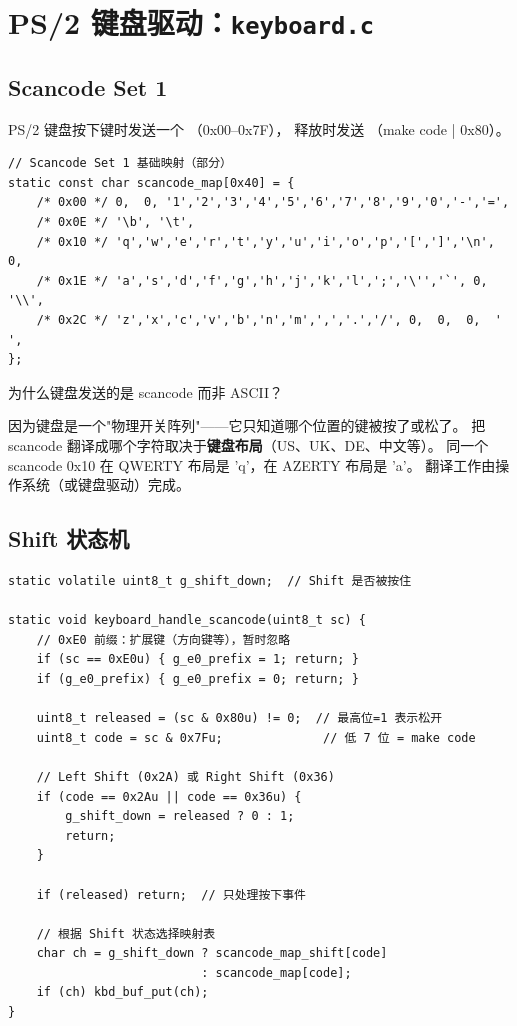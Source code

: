 \section{PS/2 键盘驱动：\texttt{keyboard.c}}

\subsection{Scancode Set 1}

PS/2 键盘按下键时发送一个 （0x00--0x7F），
释放时发送 （make code | 0x80）。

\begin{lstlisting}[style=cstyle]
// Scancode Set 1 基础映射（部分）
static const char scancode_map[0x40] = {
    /* 0x00 */ 0,  0, '1','2','3','4','5','6','7','8','9','0','-','=',
    /* 0x0E */ '\b', '\t',
    /* 0x10 */ 'q','w','e','r','t','y','u','i','o','p','[',']','\n', 0,
    /* 0x1E */ 'a','s','d','f','g','h','j','k','l',';','\'','`', 0, '\\',
    /* 0x2C */ 'z','x','c','v','b','n','m',',','.','/', 0,  0,  0,  ' ',
};
\end{lstlisting}

\begin{thinkbox}
为什么键盘发送的是 scancode 而非 ASCII？

因为键盘是一个"物理开关阵列"——它只知道哪个位置的键被按了或松了。
把 scancode 翻译成哪个字符取决于\textbf{键盘布局}（US、UK、DE、中文等）。
同一个 scancode 0x10 在 QWERTY 布局是 'q'，在 AZERTY 布局是 'a'。
翻译工作由操作系统（或键盘驱动）完成。
\end{thinkbox}

\subsection{Shift 状态机}

\begin{lstlisting}[style=cstyle]
static volatile uint8_t g_shift_down;  // Shift 是否被按住

static void keyboard_handle_scancode(uint8_t sc) {
    // 0xE0 前缀：扩展键（方向键等），暂时忽略
    if (sc == 0xE0u) { g_e0_prefix = 1; return; }
    if (g_e0_prefix) { g_e0_prefix = 0; return; }

    uint8_t released = (sc & 0x80u) != 0;  // 最高位=1 表示松开
    uint8_t code = sc & 0x7Fu;              // 低 7 位 = make code

    // Left Shift (0x2A) 或 Right Shift (0x36)
    if (code == 0x2Au || code == 0x36u) {
        g_shift_down = released ? 0 : 1;
        return;
    }

    if (released) return;  // 只处理按下事件

    // 根据 Shift 状态选择映射表
    char ch = g_shift_down ? scancode_map_shift[code]
                           : scancode_map[code];
    if (ch) kbd_buf_put(ch);
}
\end{lstlisting}

